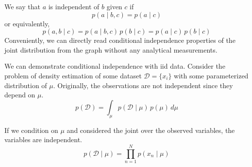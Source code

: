 \documentclass{article}
\begin{document}
  \begin{definition}
    \label{def:conditional-independence-in-directed-graphs}
    We say that $a$ is independent of $b$ given $c$ if 
    \begin{equation}
      p(a \mid b, c) = p(a \mid c)
    \end{equation}
    or equivalently, 
    \begin{equation}
      p(a, b \mid c) = p(a \mid b, c)\, p(b \mid c) = p(a \mid c) \, p(b \mid c)
    \end{equation}
    Conveniently, we can directly read conditional independence properties of the joint distribution from the graph without any analytical measurements. 
  \end{definition}

  \begin{example}
    \label{ex:conditional-independence-on-dataset}
    We can demonstrate conditional independence with iid data. Consider the problem of density estimation of some dataset $\mathcal{D} = \{x_i\}$ with some parameterized distribution of $\mu$. Originally, the observations are not independent since they depend on $\mu$. 
    \begin{equation}
      p(\mathcal{D}) = \int_{\mu} p(\mathcal{D} \mid \mu) \, p(\mu)\, d\mu 
    \end{equation}

    \begin{figure}[H]
      \centering 
      \caption{}
      \label{fig:conditional_indep_iid_1}
    \end{figure}

    If we condition on $\mu$ and considered the joint over the observed variables, the variables are independent. 
    \begin{equation}
      p(\mathcal{D} \mid \mu) = \prod_{n=1}^N p(x_n \mid \mu)
    \end{equation}


\end{example}
\end{document}
